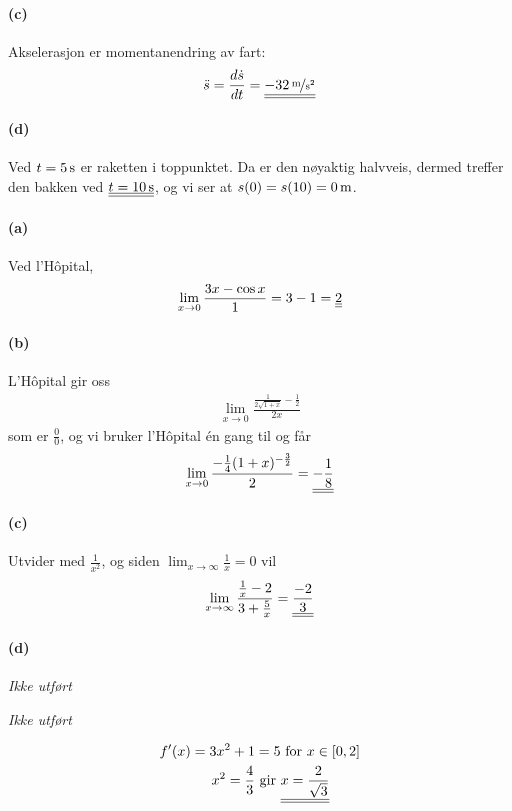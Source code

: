 \documentclass[a4paper,norsk,12pt]{article}
\begin{document}
\paragraph{(c)}
Akselerasjon er momentanendring av fart:
\begin{align*}
  \ddot{s} = \frac{d\dot{s}}{dt} = \svar{\unitfrac[-32]{m}{s^2}}
\end{align*}

\paragraph{(d)}
Ved $t=\unit[5]{s}$ er raketten i toppunktet. Da er den nøyaktig halvveis,
dermed treffer den bakken ved $\svar{t=\unit[10]{s}}$, og vi ser at
$s(0) = s(10) = \unit[0]{m}$.

\paragraph{(a)}
Ved l'Hôpital,
\begin{align*}
  \lim_{x\to 0}{\frac{3x-\cos{x}}{1}} = 3 - 1 = {\underline{\underline{2}}}
\end{align*}

\paragraph{(b)}
L'Hôpital gir oss
\begin{align*}
  \lim_{x\to 0}\frac{ \frac{1}{2\sqrt{1+x}} -\frac{1}{2} }{2x}
\end{align*}
som er $\frac{0}{0}$, og vi bruker l'Hôpital én gang til og får
\begin{align*}
  \lim_{x\to 0}\frac{ -\frac{1}{4}(1+x)^{-\frac{3}{2}} }{2} =
    {\underline{\underline{-\frac{1}{8}}}}
\end{align*}

\paragraph{(c)}
Utvider med $\frac{1}{x^2}$, og siden $\lim_{x\to\infty}\frac{1}{x} = 0$ vil
\begin{align*}
  \lim_{x\to\infty}{\frac{\frac{1}{x}-2}{3+\frac{5}{x}}} = {\underline{\underline{\frac{-2}{3}}}} \\
\end{align*}

\paragraph{(d)}
\textit{Ikke utført}

\textit{Ikke utført}

\begin{align*}
  f'(x) = 3x^2 + 1 & = 5 \text{ for } x \in [0,2]\\
  x^2 = \frac{4}{3} & \text{ gir }
  \svar{x = \frac{2}{\sqrt{3}}}
\end{align*}
\end{document}
